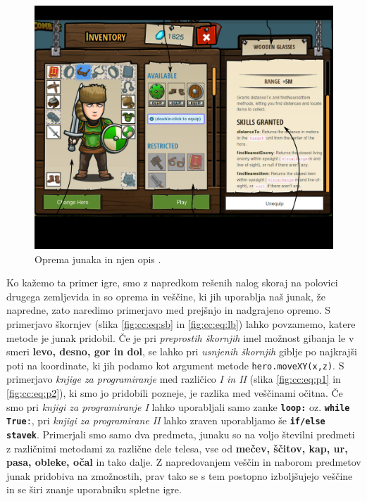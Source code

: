 \begin{figure}[h!]
  \centering
    \includegraphics [width=0.55\linewidth, keepaspectratio =
   1] {./images/sc_web/cc_izbor-zem-EQ-v01.jpg}
   \caption{Oprema junaka in njen opis \cite{web:codecombat}.}
   \label{fig:web:cc:zemljevid:EQ}
 \end{figure}
 
 Ko kažemo ta primer igre, smo z napredkom rešenih nalog skoraj na
 polovici drugega zemljevida in so oprema in veščine, ki jih uporablja
 naš junak, že napredne, zato naredimo primerjavo med prejšnjo in
 nadgrajeno opremo. S primerjavo škornjev (slika \ref{fig:cc:eq:sb} in
 \ref{fig:cc:eq:lb}) lahko povzamemo, katere metode je junak
 pridobil. Če je pri \emph{preprostih škornjih} imel možnost gibanja
 le v smeri \textbf{levo, desno, gor in dol}, se lahko pri
 \emph{usnjenih škornjih} giblje po najkrajši poti na koordinate, ki
 jih podamo kot argument metode \texttt{hero.moveXY(x,z)}. S
 primerjavo \emph{knjige za programiranje} med različico \emph{I in II}
 (slika \ref{fig:cc:eq:p1} in \ref{fig:cc:eq:p2}), ki smo jo pridobili
pozneje, je razlika med veščinami očitna. Če smo pri \emph{knjigi za
   programiranje I} lahko uporabljali samo zanke
 \texttt{\textbf{loop:}} oz. \texttt{\textbf{while True}:}, pri
 \emph{knjigi za programirane II} lahko zraven uporabljamo še
 \texttt{\textbf{if/else stavek}}. Primerjali smo samo dva predmeta,
 junaku so na voljo številni predmeti z različnimi metodami za
 različne dele telesa, vse od \textbf{mečev, ščitov, kap, ur, pasa,
   obleke, očal} in tako dalje. Z napredovanjem veščin in naborom
 predmetov junak pridobiva na zmožnostih, prav tako se s tem postopno
 izboljšujejo veščine in se širi znanje uporabniku spletne igre.

